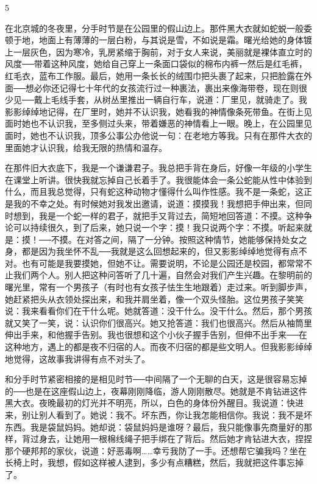 5 

在北京城的冬夜里，分手时节是在公园里的假山边上。那件黑大衣就如蛇蜕一般委顿于地，地面上有薄薄的一层白粉，与其说是雪，不如说是霜。曙光给她的身体镀上一层灰色，因为寒冷，乳房紧缩于胸前，对于女人来说，美丽就是裸体直立时的风度──带着这种风度，她给自己穿上一条面口袋似的棉布内裤一然后是红毛裤，红毛衣，蓝布工作服。最后，她用一条长长的绒围巾把头裹了起来，只把脸露在外面──想必你还记得七十年代的女孩流行过一种裹法，裹出来像海带卷，现在则很少见──戴上毛线手套，从树丛里推出一辆自行车，说道：厂里见，就骑走了。我影影绰绰地记得，在厂里时，她并不认识我，她看我的神情像条死带鱼。在街上见面时她也不认识我，至多侧过头来，带着嫌恶的神情看上一眼。晚上，在公园里见面时，她也不认识我，顶多公事公办他说一句：在老地方等我。只有在那件大衣的里面她才认识我，给我无限的热情和温存。 

在那件旧大衣底下，我是一个谦谦君子。我总把手背在身后，好像一年级的小学生在课堂上听讲。很快我就忘掉自己长着手了。我很能体会一条公蛇能从性中体验到什么，而且我总觉得，只有蛇这种动物才懂得什么叫作性感。我不是一条蛇，这正是我的不幸之处。有时候她对我发出邀请，说道：摸摸我！我想把手伸出来，但同时想到，我是一个蛇一样的君子，就把手又背过去，简短地回答道：不摸。这种争论可以持续很久，到了后来，她只说一个字：摸！我只说两个字：不摸。听起来就是：摸！──不摸。在对答之间，隔了一分钟。按照这种情节，她能够保持处女之身，都是因为我坐怀不乱──我就是这么回想起来的，但又影影绰绰地觉得有点不对。也有可能是我要摸她，但她不让。需要说明，不论是公园还是校园，都常常不止我们两个人。别人把这种问答听了几十遍，自然会对我们产生兴趣。在黎明前的曙光里，常有一个男孩子（有时也有女孩子怯生生地跟着）走过来。听到脚步声，她赶紧把头从衣领处探出来，和我并肩坐着，像一个双头怪胎。这位男孩子笑笑说：我来看看你们在干什么呢。她就答道：没干什么。没干什么。然后，那个男孩就又笑了一笑，说：认识你们很高兴。她又抢答道：我们也很高兴。然后从袖筒里伸出手来，和他握手告别。我也很想和这个小伙子握手告别，但伸不出手来──在这种地方，遇上的都是夜不归宿的人。而夜不归宿的都是些文明人。但我影影绰绰地觉得，这故事我讲得有点不对头了。 

和分手时节紧密相接的是相见时节──中间隔了一个无聊的白天，这是很容易忘掉的──也是在这座假山边上，夜幕刚刚降临，游人刚刚散尽。她就是不肯钻进这件黑大衣。夜晚最初的灯光并不明亮，所以，白色的身体份外醒目。我说道：快进来，别让别人看到了。她说：我不。坏东西，你让我怎能相信你。我说：我不是坏东西。我是袋鼠妈妈。她却说：袋鼠妈妈是谁呀？最后，我只能像事先商量好的那样，背过身去，让她用一根棉线绳子把手绑在了背后。然后她才肯钻进大衣，捏捏那个硬邦邦的家伙，说道：好恶毒啊……幸亏我防了一手。还想帮它骗我吗？坐在长椅上时，我想，假如这样被人逮到，多少有点糟糕，然后，我就把这件事忘掉了。 

